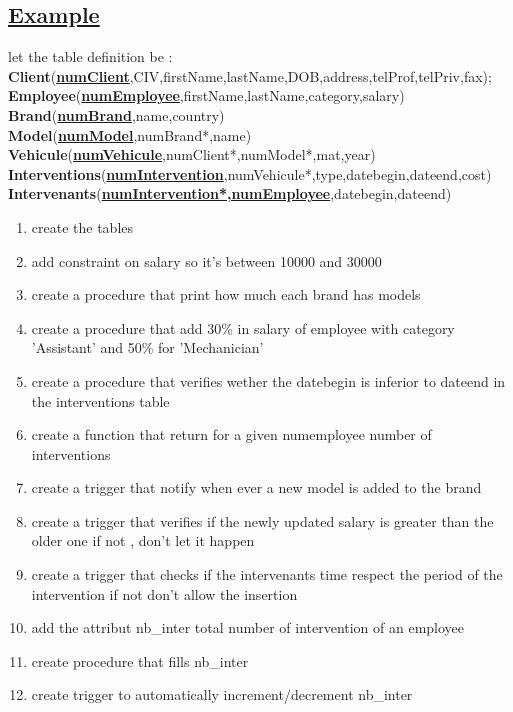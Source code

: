 \subsection*{\underline{Example}}
let the table definition be :\\[0.2cm]
\textbf{Client}(\textbf{\underline{numClient}},CIV,firstName,lastName,DOB,address,telProf,telPriv,fax);\\[0.1cm]
\textbf{Employee}(\textbf{\underline{numEmployee}},firstName,lastName,category,salary)\\[0.1cm]
\textbf{Brand}(\textbf{\underline{numBrand}},name,country)\\[0.1cm]
\textbf{Model}(\textbf{\underline{numModel}},numBrand*,name)\\[0.1cm]
\textbf{Vehicule}(\textbf{\underline{numVehicule}},numClient*,numModel*,mat,year)\\[0.1cm]
\textbf{Interventions}(\textbf{\underline{numIntervention}},numVehicule*,type,datebegin,dateend,cost)\\[0.1cm]
\textbf{Intervenants}(\textbf{\underline{numIntervention*,numEmployee}},datebegin,dateend)


\begin{enumerate}
    \item create the tables
    \item add constraint on salary so it's between 10000 and 30000 
    \item create a procedure that print how much each brand has models
    \item create a procedure that add 30\% in salary of employee with category 'Assistant' and 50\% for 'Mechanician'
    \item create a procedure that verifies wether the datebegin is inferior to dateend in the interventions table
    \item create a function that return for a given numemployee number of interventions
    \item create a trigger that notify when ever a new model is added to the brand
    \item create a trigger that verifies if the newly updated salary is greater than the older one if not , don't let it happen
    \item create a trigger that checks if the intervenants time respect the period of the intervention if not don't allow the insertion
    \item add the attribut nb\_inter total number of intervention of an employee
    \item create procedure that fills nb\_inter
    \item create trigger to automatically increment/decrement nb\_inter
\end{enumerate}


